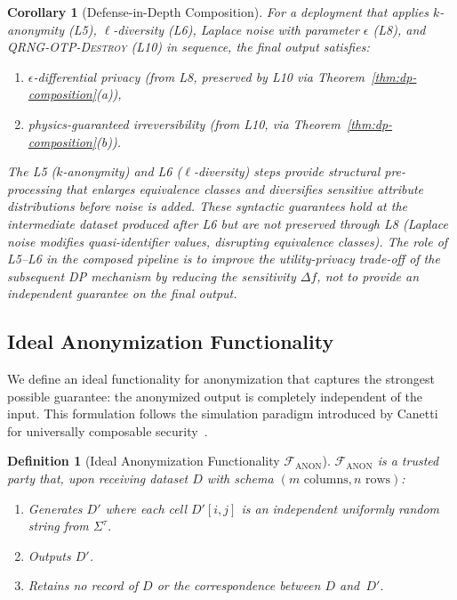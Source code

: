 \documentclass[journal]{IEEEtran}
\newtheorem{corollary}[theorem]{Corollary}
\newtheorem{definition}{Definition}
\begin{document}
\begin{corollary}[Defense-in-Depth Composition]
\label{cor:defense-in-depth}
For a deployment that applies $k$-anonymity (L5), $\ell$-diversity (L6), Laplace noise with parameter $\epsilon$ (L8), and \textsc{QRNG-OTP-Destroy} (L10) in sequence, the final output satisfies:
\begin{enumerate}
\item[(i)] $\epsilon$-differential privacy (from L8, preserved by L10 via Theorem~\ref{thm:dp-composition}(a)),
\item[(ii)] physics-guaranteed irreversibility (from L10, via Theorem~\ref{thm:dp-composition}(b)).
\end{enumerate}
The L5 ($k$-anonymity) and L6 ($\ell$-diversity) steps provide structural pre-processing that enlarges equivalence classes and diversifies sensitive attribute distributions before noise is added. These syntactic guarantees hold at the intermediate dataset produced after L6 but are not preserved through L8 (Laplace noise modifies quasi-identifier values, disrupting equivalence classes). The role of L5--L6 in the composed pipeline is to improve the utility-privacy trade-off of the subsequent DP mechanism by reducing the sensitivity $\Delta f$, not to provide an independent guarantee on the final output.
\end{corollary}

\subsection{Ideal Anonymization Functionality}
\label{subsec:uc}

We define an ideal functionality for anonymization that captures the strongest possible guarantee: the anonymized output is completely independent of the input. This formulation follows the simulation paradigm introduced by Canetti for universally composable security~\cite{canetti2001uc}.

\begin{definition}[Ideal Anonymization Functionality $\mathcal{F}_{\mathrm{ANON}}$]
\label{def:f-anon}
$\mathcal{F}_{\mathrm{ANON}}$ is a trusted party that, upon receiving dataset $D$ with schema $(m\text{ columns}, n\text{ rows})$:
\begin{enumerate}
\item Generates $D'$ where each cell $D'[i,j]$ is an independent uniformly random string from $\Sigma^\tau$.
\item Outputs $D'$.
\item Retains no record of $D$ or the correspondence between $D$ and~$D'$.
\end{enumerate}
\end{definition}
\end{document}
